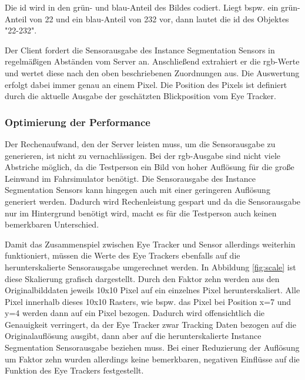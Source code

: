 Die \acrshort{id} wird in den grün- und blau-Anteil des Bildes codiert. Liegt bspw. ein grün-Anteil von 22 und ein blau-Anteil von 232 vor, dann lautet die \acrshort{id} des Objektes "22-232".

Der Client fordert die Sensorausgabe des Instance Segmentation Sensors in regelmäßigen Abständen vom Server an. Anschließend extrahiert er die \acrshort{rgb}-Werte und wertet diese nach den oben beschriebenen Zuordnungen aus. Die Auswertung erfolgt dabei immer genau an einem Pixel. Die Position des Pixels ist definiert durch die aktuelle Ausgabe der geschätzten Blickposition vom Eye Tracker. 

\subsubsection{Optimierung der Performance}
Der Rechenaufwand, den der Server leisten muss, um die Sensorausgabe zu generieren, ist nicht zu vernachlässigen. Bei der \acrshort{rgb}-Ausgabe sind nicht viele Abstriche möglich, da die Testperson ein Bild von hoher Auflösung für die große Leinwand im Fahrsimulator benötigt. Die Sensorausgabe des Instance Segmentation Sensors kann hingegen auch mit einer geringeren Auflösung generiert werden. Dadurch wird Rechenleistung gespart und da die Sensorausgabe nur im Hintergrund benötigt wird, macht es für die Testperson auch keinen bemerkbaren Unterschied. 

Damit das Zusammenspiel zwischen Eye Tracker und Sensor allerdings weiterhin funktioniert, müssen die Werte des Eye Trackers ebenfalls auf die herunterskalierte Sensorausgabe umgerechnet werden. In Abbildung \ref{fig:scale} ist diese Skalierung grafisch dargestellt. Durch den Faktor zehn werden aus den Originalbilddaten jeweils 10x10 Pixel auf ein einzelnes Pixel herunterskaliert. Alle Pixel innerhalb dieses 10x10 Rasters, wie bspw. das Pixel bei Position x=7 und y=4 werden dann auf ein Pixel bezogen. Dadurch wird offensichtlich die Genauigkeit verringert, da der Eye Tracker zwar Tracking Daten bezogen auf die Originalauflösung ausgibt, dann aber auf die herunterskalierte Instance Segmentation Sensorausgabe beziehen muss. Bei einer Reduzierung der Auflösung um Faktor zehn wurden allerdings keine bemerkbaren, negativen Einflüsse auf die Funktion des Eye Trackers festgestellt.



